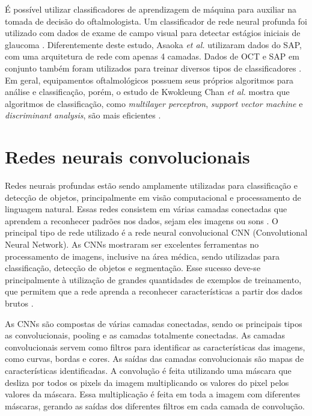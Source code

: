 \documentclass[conference]{IEEEtran}
\begin{document}
É possível utilizar classificadores de aprendizagem de máquina para auxiliar na tomada de decisão do oftalmologista. Um classificador de rede neural profunda foi utilizado com dados de exame de campo visual para detectar estágios iniciais de glaucoma \cite{Asaoka2016}. Diferentemente deste estudo, Asaoka \textit{et al.} utilizaram dados do SAP, com uma arquitetura de rede com apenas 4 camadas. Dados de OCT e SAP em conjunto também foram utilizados para treinar diversos tipos de classificadores \cite{bowd2008, silva2013}. Em geral, equipamentos oftalmológicos possuem seus próprios algoritmos para análise e classificação, porém, o estudo de Kwokleung Chan \textit{et al.} mostra que algoritmos de classificação, como \textit{multilayer perceptron}, \textit{support vector machine} e \textit{discriminant analysis}, são mais eficientes \cite{kwokleung2002}.


\section{Redes neurais convolucionais}


Redes neurais profundas estão sendo amplamente utilizadas para classificação e detecção de objetos, principalmente em visão computacional e processamento de linguagem natural. Essas redes consistem em várias camadas conectadas que aprendem a reconhecer padrões nos dados, sejam eles imagens ou sons \cite{LeCun2015}. O principal tipo de rede utilizado é a rede neural convolucional CNN (Convolutional Neural Network). As CNNs mostraram ser excelentes ferramentas no processamento de imagens, inclusive na área médica, sendo utilizadas para classificação, detecção de objetos e segmentação. Esse sucesso deve-se principalmente à utilização de grandes quantidades de exemplos de treinamento, que permitem que a rede aprenda a reconhecer características a partir dos dados brutos \cite{greenspan2016}. %

As CNNs são compostas de várias camadas conectadas, sendo os principais tipos as convolucionais, pooling e as camadas totalmente conectadas. As camadas convolucionais servem como filtros para identificar as características das imagens, como curvas, bordas e cores. As saídas das camadas convolucionais são mapas de características identificadas. A convolução é feita utilizando uma máscara que desliza por todos os pixels da imagem multiplicando os valores do pixel pelos valores da máscara. Essa multiplicação é feita em toda a imagem com diferentes máscaras, gerando as saídas dos diferentes filtros em cada camada de convolução.
\end{document}
